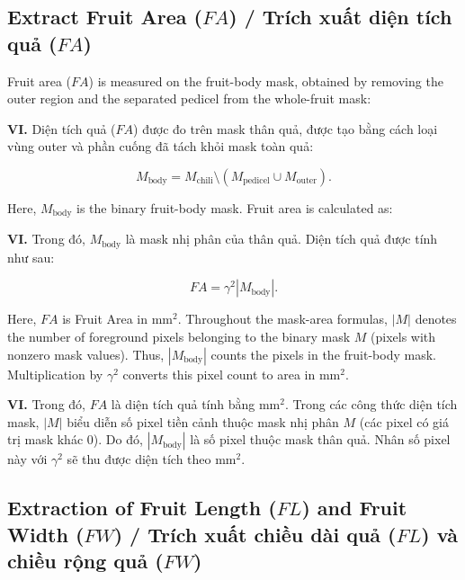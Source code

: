\documentclass[final,1p,11pt,longtitle]{elsarticle}
\newenvironment{viet}{\par\smallskip\begingroup\color{viColor}\noindent\textbf{VI. }\ignorespaces}{\par\endgroup\smallskip}
\begin{document}
\subsection*{Extract Fruit Area ($FA$) / {\color{viColor} Trích xuất diện tích quả ($FA$)}}

Fruit area ($FA$) is measured on the fruit-body mask, obtained by removing the outer region and the separated pedicel from the whole-fruit mask:

\begin{viet}
Diện tích quả ($FA$) được đo trên mask thân quả, được tạo bằng cách loại vùng outer và phần cuống đã tách khỏi mask toàn quả:
\end{viet}

\begin{equation}
M_{\mathrm{body}}=M_{\mathrm{chili}}\setminus\left(M_{\mathrm{pedicel}}\cup M_{\mathrm{outer}}\right).
\end{equation}

Here, $M_{\mathrm{body}}$ is the binary fruit-body mask. Fruit area is calculated as:

\begin{viet}
Trong đó, $M_{\mathrm{body}}$ là mask nhị phân của thân quả. Diện tích quả được tính như sau:
\end{viet}

\begin{equation}
FA=\gamma^2|M_{\mathrm{body}}|.
\end{equation}

Here, $FA$ is Fruit Area in mm$^2$. Throughout the mask-area formulas, $|M|$ denotes the number of foreground pixels belonging to the binary mask $M$ (pixels with nonzero mask values). Thus, $|M_{\mathrm{body}}|$ counts the pixels in the fruit-body mask. Multiplication by $\gamma^2$ converts this pixel count to area in mm$^2$.

\begin{viet}
Trong đó, $FA$ là diện tích quả tính bằng mm$^2$. Trong các công thức diện tích mask, $|M|$ biểu diễn số pixel tiền cảnh thuộc mask nhị phân $M$ (các pixel có giá trị mask khác 0). Do đó, $|M_{\mathrm{body}}|$ là số pixel thuộc mask thân quả. Nhân số pixel này với $\gamma^2$ sẽ thu được diện tích theo mm$^2$.
\end{viet}

\subsection*{Extraction of Fruit Length ($FL$) and Fruit Width ($FW$) / {\color{viColor} Trích xuất chiều dài quả ($FL$) và chiều rộng quả ($FW$)}}
\end{document}

